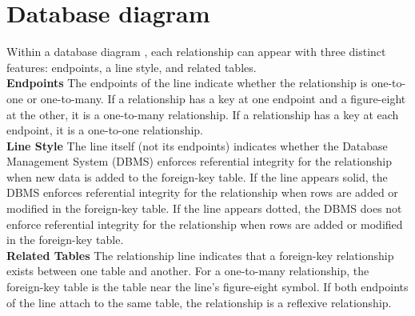 \documentclass[12pt,a4paper]{report}
\newcommand\tab[1][0cm]{\hspace*{#1}}
\begin{document}
\section{Database diagram}
	\justify\tab Within a database diagram \cite{Ref:12}, each relationship can appear with three distinct features: endpoints, a line style, and related tables.\\
\textbf{Endpoints} The endpoints of the line indicate whether the relationship is one-to-one or one-to-many. If a relationship has a key at one endpoint and a figure-eight at the other, it is a one-to-many relationship. If a relationship has a key at each endpoint, it is a one-to-one relationship.\\
\textbf{Line Style} The line itself (not its endpoints) indicates whether the Database Management System (DBMS) enforces referential integrity for the relationship when new data is added to the foreign-key table. If the line appears solid, the DBMS enforces referential integrity for the relationship when rows are added or modified in the foreign-key table. If the line appears dotted, the DBMS does not enforce referential integrity for the relationship when rows are added or modified in the foreign-key table.\\
\textbf{Related Tables} The relationship line indicates that a foreign-key relationship exists between one table and another. For a one-to-many relationship, the foreign-key table is the table near the line's figure-eight symbol. If both endpoints of the line attach to the same table, the relationship is a reflexive relationship.
\end{document}
